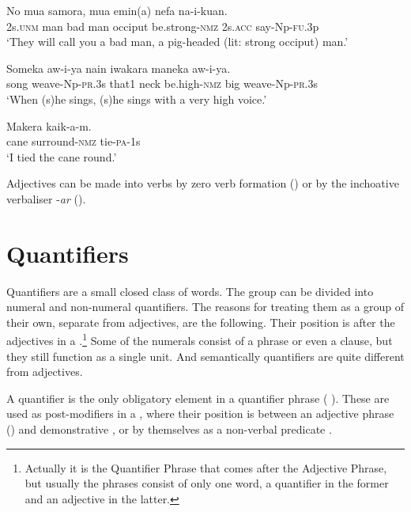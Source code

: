 \ea%
\label{ex:3:x1766}
\gll No mua samora, mua emin(a) \textstyleEmphasizedVernacularWords{-} nefa na-i-kuan.\\
2s.\textsc{unm} man bad man occiput be.strong-\textsc{nmz} 2s.\textsc{acc} say-Np-\textsc{fu}.3p\\
\glt`They will call you a bad man, a pig-headed (lit: strong occiput) man.'
\z

\ea%
\label{ex:3:x1765}
\gll Someka aw-i-ya nain iwakara  maneka aw-i-ya.\\
song weave-Np-\textsc{pr}.3s that1 neck be.high-\textsc{nmz} big weave-Np-\textsc{pr}.3s\\
\glt`When (s)he sings, (s)he sings with a very high voice.'
\z

\ea%
\label{ex:3:x1767}
\gll Makera \textstyleEmphasizedVernacularWords{-} kaik-a-m. \\
cane surround-\textsc{nmz} tie-\textsc{pa}-1s\\
\glt`I tied the cane round.'
\z

Adjectives can be made into verbs by zero verb formation () or by the inchoative verbaliser \nobreakdash-\textit{ar} ().

\section{Quantifiers}\label{sec:3:4}
{}
Quantifiers are a small closed class of words. The group can be divided into numeral and non-numeral quantifiers. The reasons for treating them as a group of their own, separate from adjectives, are the following. Their position is after the adjectives in a .\footnote{Actually it is the Quantifier Phrase that comes after the Adjective Phrase, but usually the phrases consist of only one word, a quantifier in the former and an adjective in the latter.} Some of the numerals consist of a phrase or even a clause, but they still function as a single unit. And semantically quantifiers are quite different from adjectives.

A quantifier is the only obligatory element in a quantifier phrase ( ). These are used as post-modifiers in a , where their position is between an adjective phrase () and demonstrative , or by themselves as a non-verbal predicate . 

